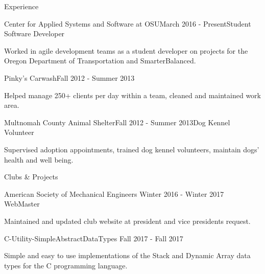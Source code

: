 \documentclass{resume} %
\begin{document}

\begin{rSection}{Experience}

  \begin{rSubsection}{Center for Applied Systems and Software at OSU}{March 2016 - Present}{Student Software Developer}{}
  \item Worked in agile development teams as a student developer on projects for the Oregon  Department of Transportation and SmarterBalanced.
  \end{rSubsection}

  \begin{rSubsection}{Pinky’s Carwash}{Fall 2012 - Summer 2013}{}{}
  \item Helped manage 250+ clients per day within a team, cleaned and maintained work area.
  \end{rSubsection}
  
  \begin{rSubsection}{Multnomah County Animal Shelter}{Fall 2012 - Summer 2013}{Dog Kennel Volunteer}{}
  \item Supervised adoption appointments, trained dog kennel volunteers, maintain dogs’ health and well being. 
  \end{rSubsection}

\end{rSection}


\begin{rSection}{Clubs \& Projects}
	\begin{rSubsection} {American Society of Mechanical Engineers} {Winter 2016 - Winter 2017} {WebMaster} {}
	\item Maintained and updated club website at president and vice presidents request.
	\end{rSubsection}
    
    \begin{rSubsection} {C-Utility-SimpleAbstractDataTypes} {Fall 2017 - Fall 2017} {} {}
    \item Simple and easy to use implementations of the Stack and Dynamic Array data types for the C programming language.
    \end{rSubsection}


\end{rSection}
\end{document}
